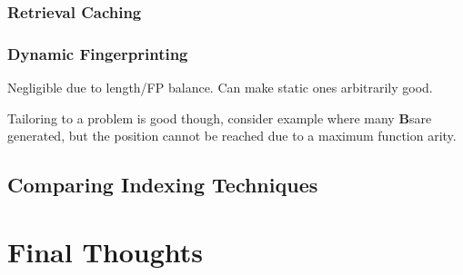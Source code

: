 \subsubsection{Retrieval Caching}
\subsubsection{Dynamic Fingerprinting}
Negligible due to length/FP balance. Can make static ones arbitrarily good.

Tailoring to a problem is good though, consider example where many \textbf{B}sare generated,
 but the position cannot be reached due to a maximum function arity.

\subsection{Comparing Indexing Techniques}

\section{Final Thoughts}

